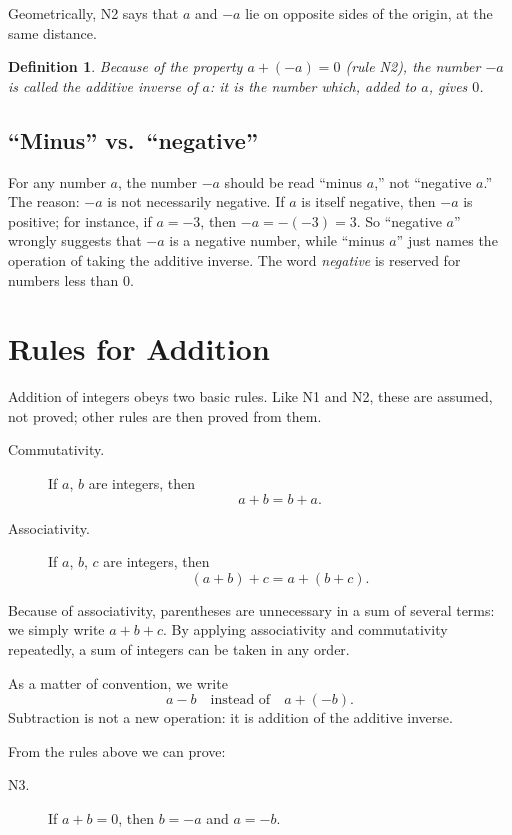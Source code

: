 \documentclass[11pt]{article}
\newtheorem{definition}{Definition}[section]
\begin{document}
Geometrically, N2 says that $a$ and $-a$ lie on opposite sides of the
origin, at the same distance.

\begin{definition}
  Because of the property $a + (-a) = 0$ (rule N2), the number $-a$ is
  called the \emph{additive inverse} of $a$: it is the number which,
  added to $a$, gives $0$.
\end{definition}

\subsection*{``Minus'' vs.\ ``negative''}

For any number $a$, the number $-a$ should be read ``minus $a$,'' not
``negative $a$.'' The reason: $-a$ is not necessarily negative. If $a$ is
itself negative, then $-a$ is positive; for instance, if $a = -3$, then
$-a = -(-3) = 3$. So ``negative $a$'' wrongly suggests that $-a$ is a
negative number, while ``minus $a$'' just names the operation of taking
the additive inverse. The word \emph{negative} is reserved for numbers
less than $0$.

\section{Rules for Addition}

Addition of integers obeys two basic rules. Like N1 and N2, these are
assumed, not proved; other rules are then proved from them.

\begin{description}
  \item[Commutativity.] If $a$, $b$ are integers, then
    \[ a + b = b + a. \]
  \item[Associativity.] If $a$, $b$, $c$ are integers, then
    \[ (a + b) + c = a + (b + c). \]
\end{description}

Because of associativity, parentheses are unnecessary in a sum of several
terms: we simply write $a + b + c$. By applying associativity and
commutativity repeatedly, a sum of integers can be taken in any order.

As a matter of convention, we write
\[ a - b \quad \text{instead of} \quad a + (-b). \]
Subtraction is not a new operation: it is addition of the additive
inverse.

From the rules above we can prove:

\begin{description}
  \item[N3.] If $a + b = 0$, then $b = -a$ and $a = -b$.
\end{description}
\end{document}
